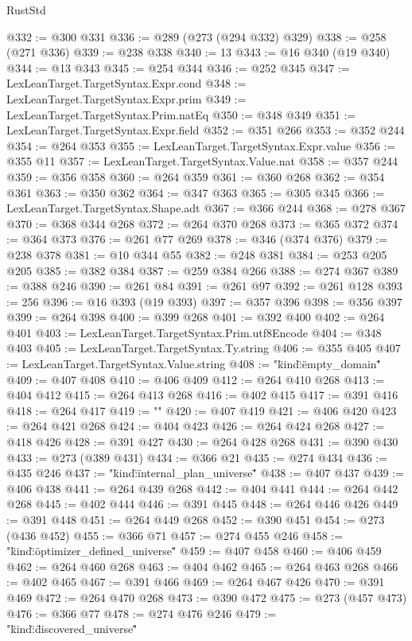 \begin{lexlean}{RustStd}
\begin{coremodule}
{\begin{coremodule}
{{{{{{{{{{{{{{{{{{{{{{{{{{{{{{{{{{{{{{{{{{{{{{{{{{{{{{{{{{{{{{{{{{@332 := @300 @331
@336 := @289 (@273 (@294 @332) @329)
@338 := @258 (@271 @336)
@339 := @238 @338
@340 := 13
@343 := @16 @340 (@19 @340)
@344 := @13 @343
@345 := @254 @344
@346 := @252 @345
@347 := LexLeanTarget.TargetSyntax.Expr.cond
@348 := LexLeanTarget.TargetSyntax.Expr.prim
@349 := LexLeanTarget.TargetSyntax.Prim.natEq
@350 := @348 @349
@351 := LexLeanTarget.TargetSyntax.Expr.field
@352 := @351 @266
@353 := @352 @244
@354 := @264 @353
@355 := LexLeanTarget.TargetSyntax.Expr.value
@356 := @355 @11
@357 := LexLeanTarget.TargetSyntax.Value.nat
@358 := @357 @244
@359 := @356 @358
@360 := @264 @359
@361 := @360 @268
@362 := @354 @361
@363 := @350 @362
@364 := @347 @363
@365 := @305 @345
@366 := LexLeanTarget.TargetSyntax.Shape.adt
@367 := @366 @244
@368 := @278 @367
@370 := @368 @344 @268
@372 := @264 @370 @268
@373 := @365 @372
@374 := @364 @373
@376 := @261 @77 @269
@378 := @346 (@374 @376)
@379 := @238 @378
@381 := @10 @344 @55
@382 := @248 @381
@384 := @253 @205 @205
@385 := @382 @384
@387 := @259 @384 @266
@388 := @274 @367
@389 := @388 @246
@390 := @261 @84
@391 := @261 @97
@392 := @261 @128
@393 := 256
@396 := @16 @393 (@19 @393)
@397 := @357 @396
@398 := @356 @397
@399 := @264 @398
@400 := @399 @268
@401 := @392 @400
@402 := @264 @401
@403 := LexLeanTarget.TargetSyntax.Prim.utf8Encode
@404 := @348 @403
@405 := LexLeanTarget.TargetSyntax.Ty.string
@406 := @355 @405
@407 := LexLeanTarget.TargetSyntax.Value.string
@408 := "{\"kind\":\"empty_domain\""
@409 := @407 @408
@410 := @406 @409
@412 := @264 @410 @268
@413 := @404 @412
@415 := @264 @413 @268
@416 := @402 @415
@417 := @391 @416
@418 := @264 @417
@419 := "}"
@420 := @407 @419
@421 := @406 @420
@423 := @264 @421 @268
@424 := @404 @423
@426 := @264 @424 @268
@427 := @418 @426
@428 := @391 @427
@430 := @264 @428 @268
@431 := @390 @430
@433 := @273 (@389 @431)
@434 := @366 @21
@435 := @274 @434
@436 := @435 @246
@437 := "{\"kind\":\"internal_plan_universe\""
@438 := @407 @437
@439 := @406 @438
@441 := @264 @439 @268
@442 := @404 @441
@444 := @264 @442 @268
@445 := @402 @444
@446 := @391 @445
@448 := @264 @446 @426
@449 := @391 @448
@451 := @264 @449 @268
@452 := @390 @451
@454 := @273 (@436 @452)
@455 := @366 @71
@457 := @274 @455 @246
@458 := "{\"kind\":\"optimizer_defined_universe\""
@459 := @407 @458
@460 := @406 @459
@462 := @264 @460 @268
@463 := @404 @462
@465 := @264 @463 @268
@466 := @402 @465
@467 := @391 @466
@469 := @264 @467 @426
@470 := @391 @469
@472 := @264 @470 @268
@473 := @390 @472
@475 := @273 (@457 @473)
@476 := @366 @77
@478 := @274 @476 @246
@479 := "{\"kind\":\"discovered_universe\""
}}}}}}}}}}}}}}}}}}}}}}}}}}}}}}}}}}}}}}}}}}}}}}}}}}}}}}}}}}}}}}}}}}}}}
\end{coremodule}}
\end{coremodule}
\end{lexlean}
